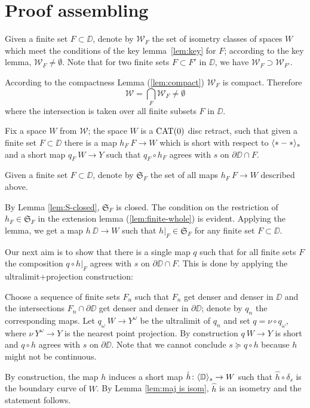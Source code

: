 \section{Proof assembling}\label{Main theorem}



Given a finite set $F\subset \DD$,
denote by $\mathcal{W}_F$
the set of isometry classes of spaces $W$ which meet the conditions of the key lemma~\ref{lem:key}
for $F$;
according to the key lemma, $\mathcal{W}_F\ne\emptyset$.
Note that for two finite sets $F\subset F'$ in $\DD$,
we have $\mathcal{W}_F\supset \mathcal{W}_{F'}$.

According to the compactness Lemma (\ref{lem:compact}) $\mathcal{W}_F$ is compact.
Therefore 
\[\mathcal{W}
=
\bigcap_{F}\mathcal{W}_F\ne \emptyset\]
where the intersection is taken over all finite subsets $F$ in $\DD$. 


Fix a space $W$ from $\mathcal{W}$;
the space $W$ is a $\mathop{\rm CAT}\nolimits(0)$ disc retract,
such that given a finite set $F\subset \DD$ there is a map $h_F\:F\to W$ which is short with 
respect to $\langle{*}-{*}\rangle_s$ 
and a short map $q_F\:W\to Y$ such that $q_F\circ h_F$ agrees with $s$ on $\partial\DD\cap F$.

Given a finite set $F\subset \DD$,
denote by $\mathfrak{S}_F$ the set of all maps $h_F\:F\to W$ described above.

By Lemma \ref{lem:S-closed}, $\mathfrak{S}_F$ is closed.
The condition on the restriction of $h_F\in  \mathfrak{S}_F$ in the extension lemma (\ref{lem:finite-whole}) is evident.
Applying the lemma,
we get a map $h\:\DD\to W$ such that $h|_F\in \mathfrak{S}_F$
for any finite set $F\subset \DD$.

Our next aim is to show that there is a single map $q$ such that
for all finite sets $F$ the composition $q\circ h|_F$ agrees with
$s$ on $\partial\DD\cap F$.
This is done by applying the ultralimit+projection construction:

Choose a sequence of finite sets $F_n$ such that $F_n$ get denser and denser in $\DD$ and
the intersections $F_n\cap\partial \DD$ get denser and denser in $\partial \DD$; 
denote by $q_n$ the corresponding maps.
Let $q_\omega\:W\to Y^\omega$ be the ultralimit of $q_n$ and set $q=\nu\circ q_\omega$,
where $\nu\:Y^\omega\to Y$ is the nearest point projection.
By construction $q\:W\to Y$ is short and $q\circ h$ agrees with $s$ on $\partial \DD$.
Note that we cannot conclude $s\succcurlyeq q\circ h$ because $h$ might not be continuous.

By construction, the map $h$ induces a short map $\hat h\colon\langle\mathbb{D}\rangle_s\to W$ 
such that $\hat h\circ\delta_s$ is the boundary curve of $W$.
By Lemma \ref{lem:maj is isom}, $\hat h$ is an isometry and the statement follows.
\qeds